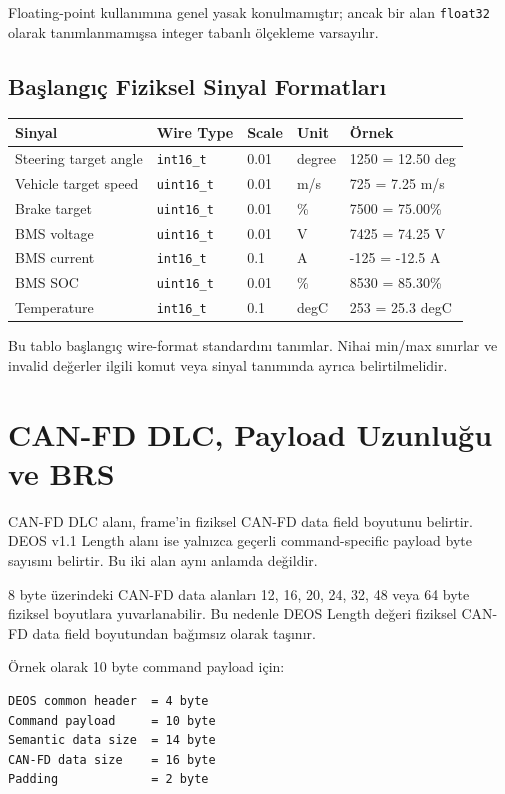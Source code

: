 \documentclass[a4paper,10pt]{article}
\newcommand{\code}[1]{\texttt{#1}}
\begin{document}
Floating-point kullanımına genel yasak konulmamıştır; ancak bir alan \code{float32}
olarak tanımlanmamışsa integer tabanlı ölçekleme varsayılır.

\subsection{Başlangıç Fiziksel Sinyal Formatları}

\begin{center}
\begin{tabularx}{\textwidth}{l l l l X}
\toprule
Sinyal & Wire Type & Scale & Unit & Örnek \\
\midrule
Steering target angle & \code{int16\_t} & 0.01 & degree & 1250 = 12.50 deg \\
Vehicle target speed & \code{uint16\_t} & 0.01 & m/s & 725 = 7.25 m/s \\
Brake target & \code{uint16\_t} & 0.01 & \% & 7500 = 75.00\% \\
BMS voltage & \code{uint16\_t} & 0.01 & V & 7425 = 74.25 V \\
BMS current & \code{int16\_t} & 0.1 & A & -125 = -12.5 A \\
BMS SOC & \code{uint16\_t} & 0.01 & \% & 8530 = 85.30\% \\
Temperature & \code{int16\_t} & 0.1 & degC & 253 = 25.3 degC \\
\bottomrule
\end{tabularx}
\end{center}

Bu tablo başlangıç wire-format standardını tanımlar. Nihai min/max sınırlar ve
invalid değerler ilgili komut veya sinyal tanımında ayrıca belirtilmelidir.

\section{CAN-FD DLC, Payload Uzunluğu ve BRS}

CAN-FD DLC alanı, frame'in fiziksel CAN-FD data field boyutunu belirtir. DEOS v1.1
Length alanı ise yalnızca geçerli command-specific payload byte sayısını belirtir. Bu iki
alan aynı anlamda değildir.

8 byte üzerindeki CAN-FD data alanları 12, 16, 20, 24, 32, 48 veya 64 byte fiziksel
boyutlara yuvarlanabilir. Bu nedenle DEOS Length değeri fiziksel CAN-FD data field
boyutundan bağımsız olarak taşınır.

Örnek olarak 10 byte command payload için:

\begin{verbatim}
DEOS common header  = 4 byte
Command payload     = 10 byte
Semantic data size  = 14 byte
CAN-FD data size    = 16 byte
Padding             = 2 byte
\end{verbatim}
\end{document}
